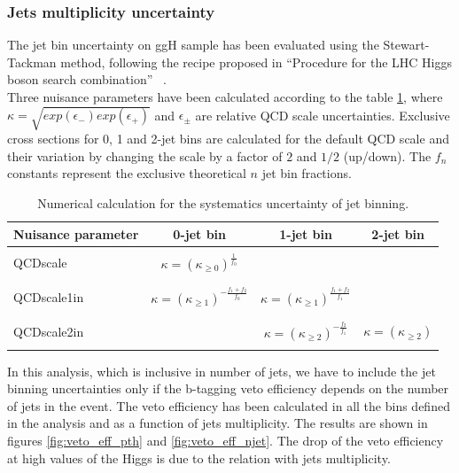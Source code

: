 \subsubsection{Jets multiplicity uncertainty \label{subsec:stewart-tackman}}
The jet bin uncertainty on ggH sample has been evaluated using the Stewart-Tackman method, following the recipe proposed in ``Procedure for the LHC Higgs boson search combination'' ~\cite{CMS-NOTE-2011-005}.\\
Three nuisance parameters have been calculated according to the table \ref{table:jet_binning_theory}, where $\kappa = \sqrt{exp(\epsilon_{-}) exp(\epsilon_{+})}$ and $\epsilon_{\pm}$ are relative QCD scale uncertainties. Exclusive cross sections for 0, 1 and 2-jet bins are calculated for the default QCD scale and their variation by changing the scale by a factor of $2$ and $1/2$ (up/down). The $f_n$ constants represent the exclusive theoretical $n$ jet bin fractions.

\begin{table}[h]
\caption{Numerical calculation for the systematics uncertainty of jet binning.}
\label{table:jet_binning_theory}
\begin{center}
\begin{tabular}{|l|c|c|c|}
\hline
Nuisance parameter & 0-jet bin                                              & 1-jet bin                                            & 2-jet bin \\ 
\hline
&&& \\
QCDscale           & $\kappa = (\kappa_{\ge 0})^{\frac{1}{f_0}} $           &                                                      & \\ 
&&&\\\hline
&&&\\
QCDscale1in        & $\kappa = (\kappa_{\ge 1})^{- \frac{f_1 + f_2}{f_0}} $ & $\kappa = (\kappa_{\ge 1})^{\frac{f_1 + f_2}{f_1}} $ & \\ 
&&&\\ \hline
&&&\\
QCDscale2in        &                                                        & $\kappa = (\kappa_{\ge 2})^{- \frac{f_2}{f_1}} $     & $\kappa = (\kappa_{\ge 2})$ \\ 
&&&\\\hline

\end{tabular}
\end{center}
\end{table}

In this analysis, which is inclusive in number of jets, we have to include the jet binning uncertainties only if the b-tagging veto efficiency depends on the number of jets in the event. The veto efficiency has been calculated in all the \pth bins defined in the analysis and as a function of jets multiplicity. The results are shown in figures \ref{fig:veto_eff_pth} and \ref{fig:veto_eff_njet}. The drop of the veto efficiency at high values of the Higgs \pt is due to the relation with jets multiplicity.

